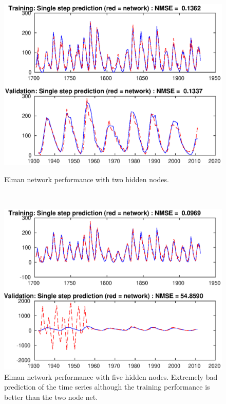\documentclass[a4paper,12pt]{article}
\theoremstyle{plain}
\theoremstyle{definition}
\begin{document}
      \begin{figure}[H]
         \vspace*{1cm}
         \hspace*{-2cm}
         \centering
         \begin{minipage}[t]{.6\textwidth}		
            \vspace{0pt}
            \centering
            \includegraphics[scale=.6]{10_2_nodes}
            \caption{Elman network performance with two hidden nodes.}
            \label{fig:10_2}
         \end{minipage}~\hspace*{1em}
         \begin{minipage}[t]{.6\textwidth}		
            \vspace{0pt}
            \centering
            \includegraphics[scale=.6, trim=1cm 0 0 0]{10_5_nodes}
            \caption{Elman network performance with five hidden nodes. Extremely
            bad prediction of the time series although the training performance
            is better than the two node net.}
            \label{fig:10_5}
         \end{minipage}
      \end{figure}
   
\end{document}
